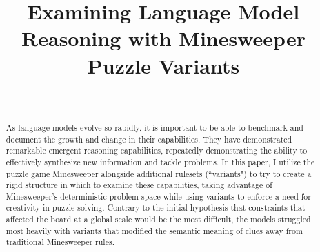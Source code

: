 \documentclass[11pt,conference,compsoc]{IEEEtran}
\begin{document}
%
\title{Examining Language Model Reasoning with Minesweeper Puzzle Variants}


\author{
\\
}









\maketitle

\begin{abstract}
As language models evolve so rapidly, it is important to be able to benchmark and document the growth and change in their capabilities. They have demonstrated remarkable emergent reasoning capabilities, repeatedly demonstrating the ability to effectively synthesize new information and tackle problems.
In this paper, I utilize the puzzle game Minesweeper alongside additional rulesets (``variants") to try to create a rigid structure in which to examine these capabilities, taking advantage of Minesweeper's deterministic problem space while using variants to enforce a need for creativity in puzzle solving.
Contrary to the initial hypothesis that constraints that affected the board at a global scale would be the most difficult, the models struggled most heavily with variants that modified the semantic meaning of clues away from traditional Minesweeper rules.
\end{abstract}


\IEEEpeerreviewmaketitle

\end{document}

